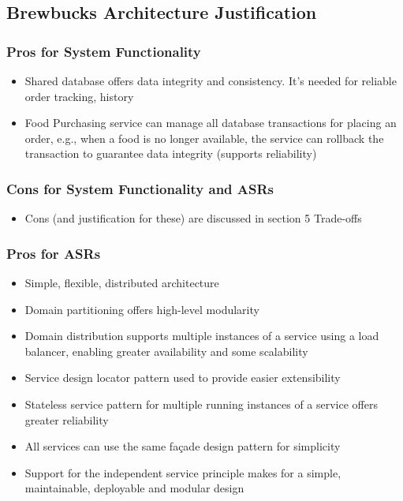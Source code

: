 \documentclass{article}
\begin{document}
\subsection{Brewbucks Architecture Justification}
\subsubsection*{Pros for System Functionality}
\begin{itemize}
    \item Shared database offers data integrity and consistency. It's needed for reliable order tracking, history
    \item Food Purchasing service can manage all database transactions for placing an order, e.g., when a food is no longer available, the service can rollback the transaction to guarantee data integrity (supports reliability)
\end{itemize}
\subsubsection*{Cons for System Functionality and ASRs}
\begin{itemize}
    \item Cons (and justification for these) are discussed in section 5 Trade-offs 
\end{itemize}

\subsubsection*{Pros for ASRs}
\begin{itemize}
    \item Simple, flexible, distributed architecture
    \item Domain partitioning offers high-level modularity 
    \item Domain distribution supports multiple instances of a service using a load balancer, enabling greater availability and some scalability 
    \item Service design locator pattern used to provide easier extensibility
    \item Stateless service pattern for multiple running instances of a service offers greater reliability
    \item All services can use the same façade design pattern for simplicity
    \item Support for the independent service principle makes for a simple, maintainable, deployable and modular design
\end{itemize}
\end{document}
